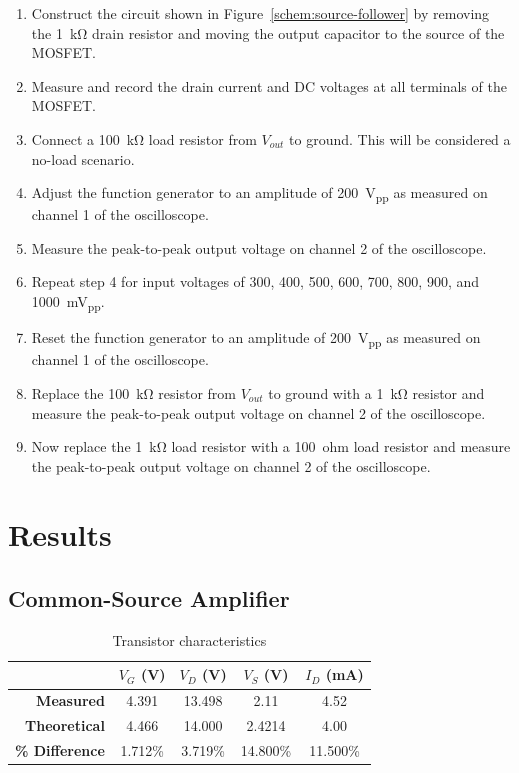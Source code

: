 \begin{enumerate}
\item Construct the circuit shown in Figure~\ref{schem:source-follower} by removing the \SI{1}{\kilo\ohm} drain resistor and moving the output capacitor to the source of the MOSFET.
\item Measure and record the drain current and DC voltages at all terminals of the MOSFET.
\item Connect a \SI{100}{\kilo\ohm} load resistor from $V_{out}$ to ground. This will be considered a no-load scenario.
\item Adjust the function generator to an amplitude of \SI{200}{V_{pp}} as measured on channel 1 of the oscilloscope.
\item Measure the peak-to-peak output voltage on channel 2 of the oscilloscope.
\item Repeat step 4 for input voltages of 300, 400, 500, 600, 700, 800, 900, and \SI{1000}{mV_{pp}}.
\item Reset the function generator to an amplitude of \SI{200}{V_{pp}} as measured on channel 1 of the oscilloscope.
\item Replace the \SI{100}{\kilo\ohm} resistor from $V_{out}$ to ground with a \SI{1}{\kilo\ohm} resistor and measure the peak-to-peak output voltage on channel 2 of the oscilloscope.
\item Now replace the \SI{1}{\kilo\ohm} load resistor with a \SI{100}{ohm} load resistor and measure the peak-to-peak output voltage on channel 2 of the oscilloscope.
\end{enumerate}

\section{Results}

\subsection{Common-Source Amplifier}


\begin{table}[hbtp]
  \centering
  \begin{tabular}{r|cccc}
                           & $V_{G}$ (\si{V}) & $V_{D}$ (\si{V}) & $V_{S}$ (\si{V}) & $I_D$ (\si{mA}) \\
    \hline
    \textbf{Measured}      & 4.391            & 13.498           & 2.11             & 4.52            \\
    \textbf{Theoretical}   & 4.466            & 14.000           & 2.4214           & 4.00            \\
    \textbf{\% Difference} & 1.712\%          & 3.719\%          & 14.800\%         & 11.500\%        \\
  \end{tabular}
  \caption{\label{tab:tran_common} Transistor characteristics}
\end{table}

